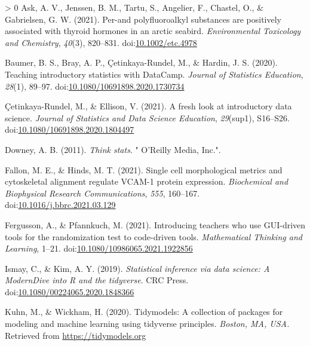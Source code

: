 \documentclass[10pt,a4paper,onecolumn]{article}
\newlength{\cslhangindent}
\newenvironment{CSLReferences}[3] %
 {%
  \setlength{\parindent}{0pt}
  \ifodd #1 \everypar{\setlength{\hangindent}{\cslhangindent}}\ignorespaces\fi
  \ifnum #2 > 0
  \setlength{\parskip}{#2\baselineskip}
  \fi
 }%
 {}
\begin{document}
\hypertarget{refs}{}
\begin{CSLReferences}{1}{0}
\leavevmode\hypertarget{ref-ask2021per}{}%
Ask, A. V., Jenssen, B. M., Tartu, S., Angelier, F., Chastel, O., \&
Gabrielsen, G. W. (2021). Per-and polyfluoroalkyl substances are
positively associated with thyroid hormones in an arctic seabird.
\emph{Environmental Toxicology and Chemistry}, \emph{40}(3), 820--831.
doi:\href{https://doi.org/10.1002/etc.4978}{10.1002/etc.4978}

\leavevmode\hypertarget{ref-baumer2020teaching}{}%
Baumer, B. S., Bray, A. P., Çetinkaya-Rundel, M., \& Hardin, J. S.
(2020). Teaching introductory statistics with DataCamp. \emph{Journal of
Statistics Education}, \emph{28}(1), 89--97.
doi:\href{https://doi.org/10.1080/10691898.2020.1730734}{10.1080/10691898.2020.1730734}

\leavevmode\hypertarget{ref-cetinkaya2021fresh}{}%
Çetinkaya-Rundel, M., \& Ellison, V. (2021). A fresh look at
introductory data science. \emph{Journal of Statistics and Data Science
Education}, \emph{29}(sup1), S16--S26.
doi:\href{https://doi.org/10.1080/10691898.2020.1804497}{10.1080/10691898.2020.1804497}

\leavevmode\hypertarget{ref-downey2011think}{}%
Downey, A. B. (2011). \emph{Think stats}. " O'Reilly Media, Inc.".

\leavevmode\hypertarget{ref-fallon2021single}{}%
Fallon, M. E., \& Hinds, M. T. (2021). Single cell morphological metrics
and cytoskeletal alignment regulate VCAM-1 protein expression.
\emph{Biochemical and Biophysical Research Communications}, \emph{555},
160--167.
doi:\href{https://doi.org/10.1016/j.bbrc.2021.03.129}{10.1016/j.bbrc.2021.03.129}

\leavevmode\hypertarget{ref-fergusson2021introducing}{}%
Fergusson, A., \& Pfannkuch, M. (2021). Introducing teachers who use
GUI-driven tools for the randomization test to code-driven tools.
\emph{Mathematical Thinking and Learning}, 1--21.
doi:\href{https://doi.org/10.1080/10986065.2021.1922856}{10.1080/10986065.2021.1922856}

\leavevmode\hypertarget{ref-ismay2019statistical}{}%
Ismay, C., \& Kim, A. Y. (2019). \emph{Statistical inference via data
science: A ModernDive into {R} and the tidyverse}. CRC Press.
doi:\href{https://doi.org/10.1080/00224065.2020.1848366}{10.1080/00224065.2020.1848366}

\leavevmode\hypertarget{ref-kuhn2020tidymodels}{}%
Kuhn, M., \& Wickham, H. (2020). Tidymodels: A collection of packages
for modeling and machine learning using tidyverse principles.
\emph{Boston, MA, USA.} Retrieved from \url{https://tidymodels.org}


\end{CSLReferences}
\end{document}
